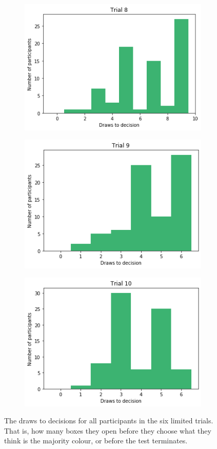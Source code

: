 \begin{figure}
\begin{subfigure}{0.48\textwidth}
    \end{subfigure}
    \hfill
    \begin{subfigure}{0.48\textwidth}
        \includegraphics[scale=0.38]{pictures/dtd8_histogram.png}
    \end{subfigure}
     \vfill
    \begin{subfigure}{0.48\textwidth}
        \includegraphics[scale=0.38]{pictures/dtd9_histogram.png}
    \end{subfigure}
    \hfill
    \begin{subfigure}{0.48\textwidth}
        \includegraphics[scale=0.38]{pictures/dtd10_histogram.png}
    \end{subfigure}
    \caption[Draws to decision in the limited trials]{The draws to decisions for all participants in the six limited trials. That is, how many boxes they open before they choose what they think is the majority colour, or before the test terminates.}
    \label{fig:dtd_limited_trials}
\end{figure}


